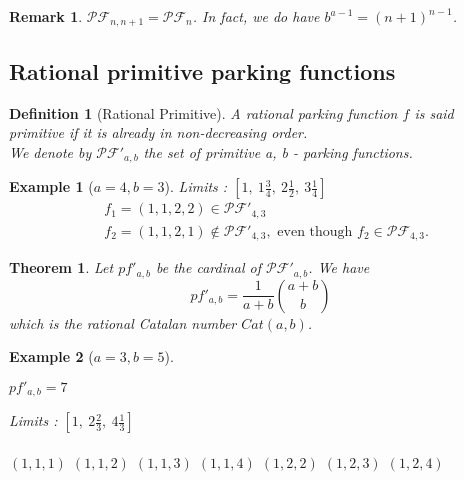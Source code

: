 \documentclass[12pt]{report}
\newtheorem{theorem}{Theorem}
\newtheorem{definition}{Definition}
\newtheorem*{example}{Example}
\newtheorem*{rem}{Remark}
\begin{document}
\begin{rem}    
    $\mathcal{PF}_{n, n+1} = \mathcal{PF}_n$.
    In fact, we do have $b^{a-1} = (n+1)^{n-1}$.
\end{rem}

\subsection{Rational primitive parking functions}

\begin{definition}[Rational Primitive]
    A rational parking function $f$ is said
    \emph{primitive} if it is already in
    non-decreasing order.\\
    We denote by $\mathcal{PF'}_{a,b}$ the set of
    primitive a, b - parking functions.
\end{definition}

\begin{example}[$a = 4, b = 3$]
    Limits : $[1,\ 1 \frac{3}{4},\ 2 \frac{1}{2},\ 
    3 \frac{1}{4}]$
    \begin{align*}
        &f_1 = (1, 1, 2, 2) \in \mathcal{PF'}_{4,3}\\
        &f_2 = (1, 1, 2, 1) \notin \mathcal{PF'}_{4,3},
        \text{ even though } f_2 \in \mathcal{PF}_{4,3}.
    \end{align*}
\end{example}

\begin{theorem}
    Let $pf'_{a,b}$ be the cardinal of
    $\mathcal{PF'}_{a,b}$.
    We have $$\displaystyle pf'_{a,b} = 
    \frac{1}{a + b} \binom{a + b}{b}$$
    which is the \emph{rational Catalan number}
    $Cat(a,b)$.
\end{theorem}

\begin{example}[$a = 3, b = 5$]
    ~\\
    \begin{itemize*}
        \item $pf'_{a,b} = 7$
        \item Limits : $[1,\ 2 \frac{2}{3},\ 
            4 \frac{1}{3}]$\\\\
        \subitem $(1, 1, 1)$
        \subitem $(1, 1, 2)$
        \subitem $(1, 1, 3)$
        \subitem $(1, 1, 4)$
        \subitem $(1, 2, 2)$
        \subitem $(1, 2, 3)$
        \subitem $(1, 2, 4)$
    \end{itemize*}    
\end{example}
\end{document}
